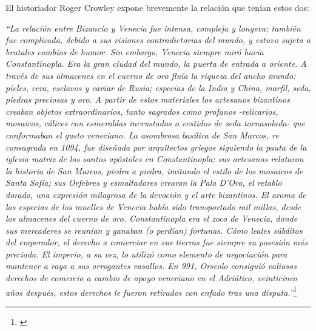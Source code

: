El historiador Roger Crowley expone brevemente la relación 
que tenían estos dos:

\textit{“La relación entre Bizancio y Venecia fue intensa, compleja y longeva; 
también fue complicada, debido a sus visiones contradictorias del mundo, 
y estuvo sujeta a brutales cambios de humor. Sin embargo, Venecia siempre 
miró hacia Constantinopla. Era la gran ciudad del mundo, la puerta de 
entrada a oriente. A través de sus almacenes en el cuerno de oro fluía 
la riqueza del ancho mundo: pieles, cera, esclavos y caviar de Rusia; 
especias de la India y China, marfil, seda, piedras preciosas y oro. 
A partir de estos materiales los artesanos bizantinos creaban objetos 
extraordinarios, tanto sagrados como profanos -relicarios, mosaicos, 
cálices con esmeraldas incrustadas o vestidos de seda tornasolada- 
que conformaban el gusto veneciano. La asombrosa basílica de San Marcos, 
re consagrada en 1094, fue diseñada por arquitectos griegos siguiendo la 
pauta de la iglesia matriz de los santos apóstoles en Constantinopla; 
sus artesanos relataron la historia de San Marcos, piedra a piedra, 
imitando el estilo de los mosaicos de Santa Sofía; sus Orfebres y 
esmaltadores crearon la Pala D’Oro, el retablo dorado, una expresión 
milagrosa de la devoción y el arte bizantinos. 
El aroma de las especias de los muelles de Venecia había sido 
transportado mil millas, desde los almacenes del cuerno de oro. 
Constantinopla era el zoco de Venecia, donde sus mercaderes se reunían y
ganaban (o perdían) fortunas. Cómo leales súbditos del emperador, 
el derecho a comerciar en sus tierras fue siempre su posesión 
más preciada. El imperio, a su vez, lo utilizó como elemento de 
negociación para mantener a raya a sus arrogantes vasallos. 
En 991, Orseolo consiguió valiosos derechos de comercio a cambio 
de apoyo veneciano en el Adriático, veinticinco años después, 
estos derechos le fueron retirados con enfado tras una disputa.”}\footnote{\cite[pp.~39--40]{venecia}}












